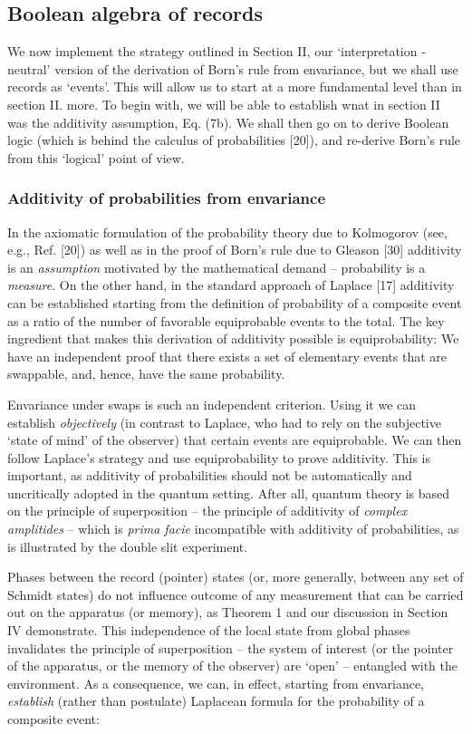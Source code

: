 \documentclass[aps,twocolumn,pra,epsfig]{revtex4}
\begin{document}
\subsection{Boolean algebra of records}

We now implement the strategy outlined in Section II, our  `interpretation -
neutral' version of the derivation of Born's rule from envariance, but we
shall use records as `events'.  This will allow us to start at a more fundamental
level than in section II. more. To begin with, we will be able to establish
wnat in section II was the additivity assumption, Eq. (7b). We shall then go on to
derive Boolean logic (which is behind the calculus of probabilities [20]), and
re-derive Born's rule from this `logical' point of view. 

\subsubsection{Additivity of probabilities from envariance}

In the axiomatic formulation of the probability theory due to Kolmogorov 
(see, e.g., Ref. [20]) as well as in the proof of Born's rule due to Gleason [30] 
additivity is an {\it assumption} motivated by the mathematical demand 
-- probability is a {\it measure}. On the other hand, in the standard
approach of Laplace [17] additivity can be established starting from the definition
of probability of a composite event as a ratio of the number of favorable
equiprobable events to the total. The key ingredient that makes this derivation
of additivity possible is equiprobability: We have an independent proof that 
there exists a set of elementary events that are swappable, and, hence, have
the same probability. 

Envariance under swaps is such an independent criterion. Using it we can 
establish {\it objectively} (in contrast to Laplace, who had to rely on the subjective
`state of mind' of the observer) that certain events are equiprobable. We can 
then follow Laplace's strategy and use equiprobability to prove additivity.
This is important, as  additivity of probabilities should not be automatically 
and uncritically adopted in the quantum setting. After all, quantum theory 
is based on the principle of superposition -- the principle of additivity of 
{\it complex amplitides} -- which is {\it prima facie} incompatible with additivity 
of probabilities, as is illustrated by the double slit experiment.

Phases between the record (pointer) states (or, more generally, between any set
of Schmidt states) do not influence outcome of any measurement that can be
carried out on the apparatus (or memory), as Theorem 1 and our discussion
in Section IV demonstrate. This independence of the local state from global phases
invalidates the principle of superposition -- the system of interest (or the
pointer of the apparatus, or the memory of the observer) are `open' 
-- entangled
with the environment. As a consequence, we can, in effect, starting from
envariance, {\it establish} (rather than postulate) Laplacean formula for
the probability of a composite event:
\end{document}
